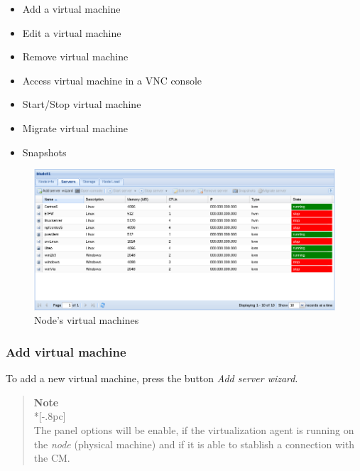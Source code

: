 \begin{itemize}
	\item Add a virtual machine
    \item Edit a virtual machine
	\item Remove virtual machine
	\item Access virtual machine in a VNC console
	\item Start/Stop virtual machine
    \item Migrate virtual machine
    \item Snapshots
\end{itemize}
\begin{figure}[H]
	\begin{center}
	\includegraphics[scale=0.45]{screenshots/node_servers.png}
	\caption{Node's virtual machines}
	\label{fig:node_servers}
	\end{center}
\end{figure}

\subsubsection{Add virtual machine}
\label{sec:add_server}

To add a new virtual machine, press the button \emph{Add server wizard}.
\begin{quote}
	{\large \bf Note} \\*[-.8pc]
	\underline{\hspace{6in}} \\
    The panel options will be enable, if the virtualization agent is running on the \emph{node} (physical machine) and if it is able to stablish a connection with the CM.
\end{quote}
 

